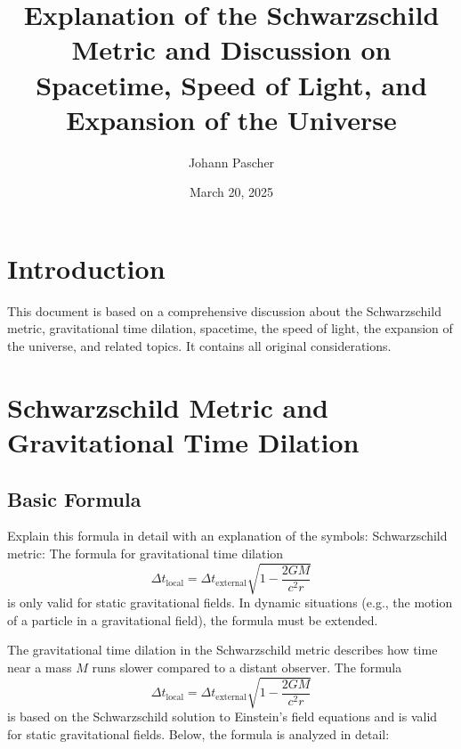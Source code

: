 \documentclass[a4paper,12pt]{article}
\begin{document}
\title{Explanation of the Schwarzschild Metric and Discussion on Spacetime, Speed of Light, and Expansion of the Universe}
\author{Johann Pascher}
\date{March 20, 2025}


	\maketitle
	\tableofcontents %
	\section{Introduction}
	This document is based on a comprehensive discussion about the Schwarzschild metric, gravitational time dilation, spacetime, the speed of light, the expansion of the universe, and related topics. It contains all original considerations.
	
	\section{Schwarzschild Metric and Gravitational Time Dilation}
	\subsection{Basic Formula}
	Explain this formula in detail with an explanation of the symbols: Schwarzschild metric: The formula for gravitational time dilation
	\[
	\Delta t_{\text{local}} = \Delta t_{\text{external}} \sqrt{1 - \frac{2 G M}{c^2 r}}
	\]
	is only valid for static gravitational fields. In dynamic situations (e.g., the motion of a particle in a gravitational field), the formula must be extended.
	
	The gravitational time dilation in the Schwarzschild metric describes how time near a mass \( M \) runs slower compared to a distant observer. The formula
	\[
	\Delta t_{\text{local}} = \Delta t_{\text{external}} \sqrt{1 - \frac{2 G M}{c^2 r}}
	\]
	is based on the Schwarzschild solution to Einstein's field equations and is valid for static gravitational fields. Below, the formula is analyzed in detail:
	
\end{document}
